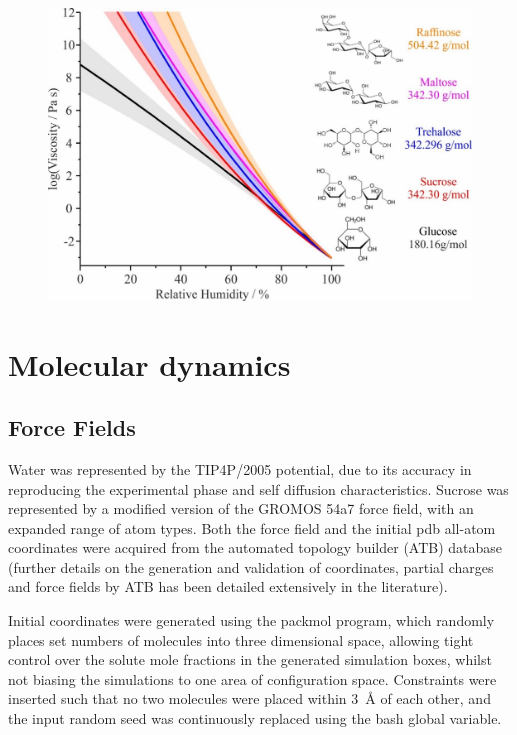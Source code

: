 \begin{figure}
    \centering
    \includegraphics{chapters/water_hopping/figures/image014.jpg}
    \label{fig:wat_s6}
\end{figure}

\section{Molecular dynamics}
\subsection{Force Fields}
Water was represented by the TIP4P/2005\cite{abascalGeneralPurposeModel2005} potential, due to its accuracy in reproducing the experimental phase and self diffusion characteristics. Sucrose was represented by a modified version of the GROMOS 54a7 force field\cite{oostenbrinkBiomolecularForceField2004}, with an expanded range of atom types. Both the force field and the initial pdb all-atom coordinates were acquired from the automated topology builder (ATB) database\cite{koziaraTestingValidationAutomated2014} (further details on the generation\cite{maldeAutomatedForceField2011} and validation\cite{schmidDefinitionTestingGROMOS2011} of coordinates, partial charges and force fields by ATB has been detailed extensively in the literature).

Initial coordinates were generated using the packmol\cite{martinez2009packmol} program, which randomly places set numbers of molecules into three dimensional space, allowing tight control over the solute mole fractions in the generated simulation boxes, whilst not biasing the simulations to one area of configuration space. Constraints were inserted such that no two molecules were placed within \SI{3}{\angstrom} of each other, and the input random seed was continuously replaced using the bash  global variable. 

